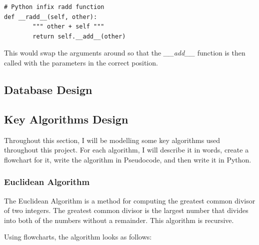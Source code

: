 \documentclass{article}
\begin{document}
\begin{lstlisting}
# Python infix radd function
def __radd__(self, other):
        """ other + self """
        return self.__add__(other)
\end{lstlisting}

This would swap the arguments around so that the \textit{\_\_add\_\_} function is then called with the parameters in the correct position.

\clearpage
\subsection{Database Design}
\clearpage

\subsection{Key Algorithms Design}
Throughout this section, I will be modelling some key algorithms used throughout this project.  For each algorithm, I will describe it in words, create a flowchart for it, write the algorithm in Pseudocode, and then write it in Python.

\subsubsection{Euclidean Algorithm}
The Euclidean Algorithm is a method for computing the greatest common divisor of two integers. The greatest common divisor is the largest number that divides into both of the numbers without a remainder. This algorithm is recursive.

Using flowcharts, the algorithm looks as follows:
\end{document}
